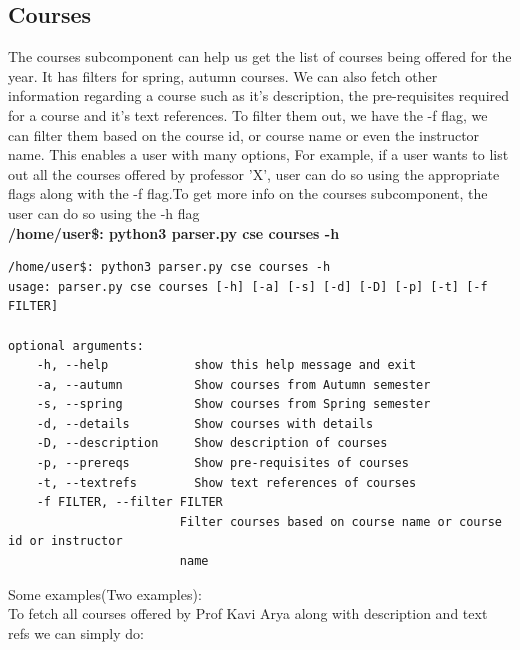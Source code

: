 \documentclass[12pt, letterpaper, twoside]{article}
\begin{document}
\subsection{Courses}
The courses subcomponent can help us get the list of courses being offered for the year. It has filters for spring, autumn courses.
We can also fetch other information regarding a course such as it's description, the pre-requisites required for a course and it's text references.
To filter them out, we have the -f flag, we can filter them based on the course id, or course name or even the instructor name. This enables a user
with many options, For example, if a user wants to list out all the courses offered by professor 'X', user can do so using the appropriate flags
along with the -f flag.To get more info on the courses subcomponent, the user can do so using the -h flag\\
\textbf{/home/user\$: python3 parser.py cse courses -h}\\
\begin{verbatim}
/home/user$: python3 parser.py cse courses -h
usage: parser.py cse courses [-h] [-a] [-s] [-d] [-D] [-p] [-t] [-f FILTER]

optional arguments:
    -h, --help            show this help message and exit
    -a, --autumn          Show courses from Autumn semester
    -s, --spring          Show courses from Spring semester
    -d, --details         Show courses with details
    -D, --description     Show description of courses
    -p, --prereqs         Show pre-requisites of courses
    -t, --textrefs        Show text references of courses
    -f FILTER, --filter FILTER
                        Filter courses based on course name or course id or instructor
                        name
\end{verbatim}
Some examples(Two examples):\\
To fetch all courses offered by Prof Kavi Arya along with description and text refs we can simply do:
\end{document}
